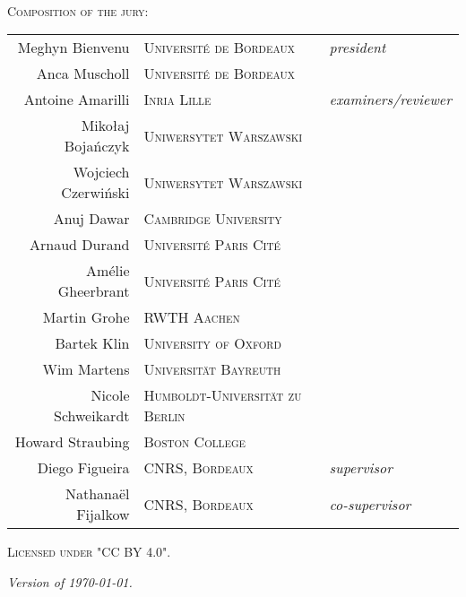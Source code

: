 \newpage
\thispagestyle{empty}
\setlength{\parindent}{0pt}
\setlength{\parskip}{\baselineskip}
\begin{fullwidth}
	~\vfill
	\begin{center}
		\normalfont\Large\scshape Composition of the jury:\\[1.5em]
		\normalfont
		\begin{tabular}{r@{\hskip 1em}l@{\hskip 1em}l}
		  Meghyn Bienvenu & \textsc{\small Université de Bordeaux} & \emph{president}\\
		  Anca Muscholl & \textsc{\small Université de Bordeaux} & \emph{}\\[.5em]
		  Antoine Amarilli & \textsc{\small Inria Lille} & \emph{examiners/reviewer}\\
		  Mikołaj Bojańczyk & \textsc{\small Uniwersytet Warszawski} & \emph{}\\
		  Wojciech Czerwiński & \textsc{\small Uniwersytet Warszawski} & \emph{}\\
		  Anuj Dawar & \textsc{\small Cambridge University} & \emph{}\\
		  Arnaud Durand & \textsc{\small Université Paris Cité} & \emph{}\\
		  Amélie Gheerbrant & \textsc{\small Université Paris Cité} & \emph{}\\
		  Martin Grohe & \textsc{\small RWTH Aachen} & \emph{}\\
		  Bartek Klin & \textsc{\small University of Oxford} & \emph{}\\
		  Wim Martens & \textsc{\small Universität Bayreuth} & \emph{} \\
		  Nicole Schweikardt & \textsc{\small Humboldt-Universität zu Berlin} & \emph{}\\
		  Howard Straubing & \textsc{\small Boston College} & \emph{}\\[.5em]
		  Diego Figueira & \textsc{\small CNRS, Bordeaux} & \emph{supervisor}\\
		  Nathanaël Fijalkow & \textsc{\small CNRS, Bordeaux} & \emph{co-supervisor}
		\end{tabular}
	\end{center}

	\vfill

	\par\textsc{Licensed under "CC BY 4.0".}
	\par\textit{Version of \today.}
\end{fullwidth}